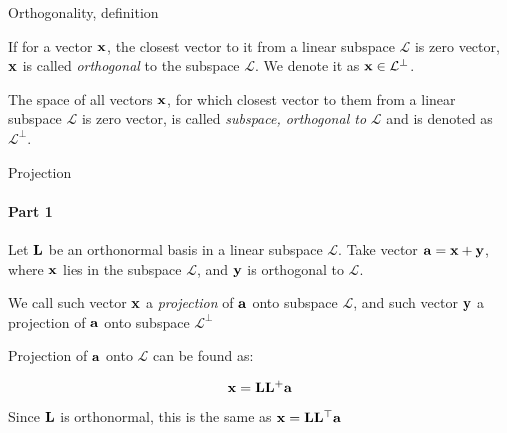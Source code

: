 \documentclass{beamer}
\begin{document}
\begin{frame}{Orthogonality, definition}
\begin{flushleft}

\begin{definition}
If for a vector $\mathbf{x}$, the closest vector to it from a linear subspace $\mathcal{L}$ is zero vector, $\mathbf{x}$ is called \emph{orthogonal} to the subspace $\mathcal{L}$. We denote it as $\mathbf{x} \in \mathcal{L}^\perp$.
\end{definition}


\begin{definition}
The space of all vectors $\mathbf{x}$, for which closest vector to them from a linear subspace $\mathcal{L}$ is zero vector, is called \emph{subspace, orthogonal to} $\mathcal{L}$ and is denoted as $\mathcal{L}^\perp$.
\end{definition}

\end{flushleft}
\end{frame}





\begin{frame}{Projection}
\framesubtitle{Part 1}
\begin{flushleft}

Let $\mathbf{L}$ be an orthonormal basis in a linear subspace $\mathcal{L}$. Take vector $\mathbf{a} = \mathbf{x} + \mathbf{y}$, where $\mathbf{x}$ lies in the subspace $\mathcal{L}$, and $\mathbf{y}$ is orthogonal to $\mathcal{L}$.

\bigskip

\begin{definition}
We call such vector $\mathbf{x}$ a \emph{projection} of $\mathbf{a}$ onto subspace $\mathcal{L}$, and such vector $\mathbf{y}$ a projection of $\mathbf{a}$ onto subspace $\mathcal{L}^\perp$
\end{definition}

\bigskip

Projection of $\mathbf{a}$ onto $\mathcal{L}$ can be found as: 

\begin{equation}
    \mathbf{x} = \mathbf{L} \mathbf{L}^+ \mathbf{a}
\end{equation}

Since $\mathbf{L}$ is orthonormal, this is the same as $\mathbf{x} = \mathbf{L} \mathbf{L}^\top \mathbf{a}$

\end{flushleft}
\end{frame}
\end{document}
